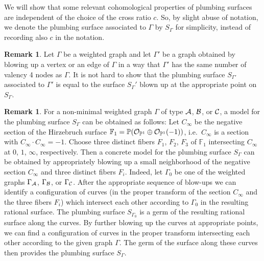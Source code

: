 \documentclass[a4paper, reqno, twoside]{amsart}
\theoremstyle{definition}
\newtheorem{remark}[theorem]{Remark}
\numberwithin{equation}{section}
\begin{document}
We will show that some relevant cohomological properties of plumbing
surfaces are independent of the choice of the cross ratio $c$. So, by
slight abuse of notation, we denote the plumbing surface associated to
$\Gamma$ by $S_{\Gamma}$ for simplicity, instead of recording also $c$
in the notation.

\begin{remark}
  Let $\Gamma$ be a weighted graph and let $\Gamma'$ be a graph
  obtained by blowing up a vertex or an edge of $\Gamma$ in a way that
  $\Gamma '$ has the same number of valency 4 nodes as $\Gamma$.  It
  is not hard to show that the plumbing surface $S_{\Gamma'}$
  associated to $\Gamma'$ is equal to the surface $S_{\Gamma}'$
  blown up at the appropriate point on $S_{\Gamma}$.
\end{remark}

\begin{remark}
  For a non-minimal weighted graph $\Gamma$ of type ${\ensuremath \mathcal{A}}$, ${\ensuremath \mathcal{B}}$, or
  ${\ensuremath \mathcal{C}}$, a model for the plumbing surface $S_{\Gamma}$ can be obtained as
  follows: Let $C_{\infty}$ be the negative section of the Hirzebruch surface
  $\mathbb{F}_1 = \mathbb{P}({\ensuremath \mathcal{O}}_{\mathbb{P}^1} \oplus
  {\ensuremath \mathcal{O}}_{\mathbb{P}^1}(-1))$, i.e.\ $C_{\infty}$ is a section with
  $C_{\infty} \cdot C_{\infty}=-1$. Choose three distinct fibers $F_1$, $F_2$,
  $F_3$ of $\mathbb{F}_1$ intersecting $C_{\infty}$ at $0$, $1$, $\infty$,
  respectively. Then a concrete model for the plumbing surface $S_{\Gamma}$
  can be obtained by appropriately blowing up a small neighborhood of the
  negative section $C_{\infty}$ and three distinct fibers $F_i$. Indeed, let
  $\Gamma_0$ be one of the weighted graphs $\Gamma_{\ensuremath \mathcal{A}}$,
  $\Gamma_{\ensuremath \mathcal{B}}$, or $\Gamma_{\ensuremath \mathcal{C}}$. After the appropriate sequence of
  blow-ups we can identify a configuration of curves (in the proper transform
  of the section $C_{\infty}$ and the three fibers $F_i$) which intersect each
  other according to $\Gamma_0$ in the resulting rational surface. The
  plumbing surface $S_{\Gamma_0}$ is a germ of the resulting rational surface
  along the curves. By further blowing up the curves at appropriate points, we
  can find a configuration of curves in the proper transform intersecting each
  other according to the given graph $\Gamma$. The germ of the surface along
  these curves then provides the plumbing surface $S_{\Gamma}$.
\end{remark}
\end{document}
